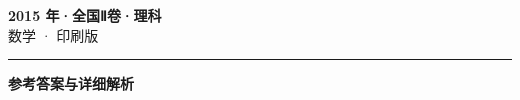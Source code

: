 \documentclass[zihao=5, a4paper]{ctexart}
\begin{document}
\begin{center}
  {\Large\bfseries 2015 年·全国Ⅱ卷·理科}\\[4pt]
  {\large 数学 · 印刷版}
\end{center}
\medskip
{}

\par\bigskip\hrule\bigskip
{}
\begin{center}{\large\bfseries 参考答案与详细解析}\end{center}
\smallskip

\end{document}
